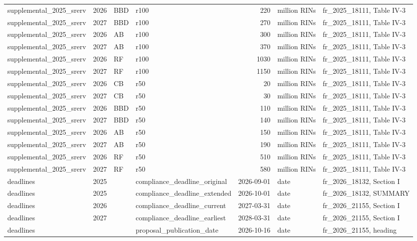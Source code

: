 \begin{longtable}{p{2.3cm}p{0.7cm}p{1.0cm}p{2.6cm}rp{1.7cm}p{4.6cm}}
supplemental\_2025\_srerv & 2026 & BBD & r100 & 220 & million RINs & fr\_2025\_18111, Table IV-3 \\
supplemental\_2025\_srerv & 2027 & BBD & r100 & 270 & million RINs & fr\_2025\_18111, Table IV-3 \\
supplemental\_2025\_srerv & 2026 & AB & r100 & 300 & million RINs & fr\_2025\_18111, Table IV-3 \\
supplemental\_2025\_srerv & 2027 & AB & r100 & 370 & million RINs & fr\_2025\_18111, Table IV-3 \\
supplemental\_2025\_srerv & 2026 & RF & r100 & 1030 & million RINs & fr\_2025\_18111, Table IV-3 \\
supplemental\_2025\_srerv & 2027 & RF & r100 & 1150 & million RINs & fr\_2025\_18111, Table IV-3 \\
supplemental\_2025\_srerv & 2026 & CB & r50 & 20 & million RINs & fr\_2025\_18111, Table IV-3 \\
supplemental\_2025\_srerv & 2027 & CB & r50 & 30 & million RINs & fr\_2025\_18111, Table IV-3 \\
supplemental\_2025\_srerv & 2026 & BBD & r50 & 110 & million RINs & fr\_2025\_18111, Table IV-3 \\
supplemental\_2025\_srerv & 2027 & BBD & r50 & 140 & million RINs & fr\_2025\_18111, Table IV-3 \\
supplemental\_2025\_srerv & 2026 & AB & r50 & 150 & million RINs & fr\_2025\_18111, Table IV-3 \\
supplemental\_2025\_srerv & 2027 & AB & r50 & 190 & million RINs & fr\_2025\_18111, Table IV-3 \\
supplemental\_2025\_srerv & 2026 & RF & r50 & 510 & million RINs & fr\_2025\_18111, Table IV-3 \\
supplemental\_2025\_srerv & 2027 & RF & r50 & 580 & million RINs & fr\_2025\_18111, Table IV-3 \\
deadlines & 2025 &  & compliance\_deadline\_original & 2026-09-01 & date & fr\_2026\_18132, Section I \\
deadlines & 2025 &  & compliance\_deadline\_extended & 2026-10-01 & date & fr\_2026\_18132, SUMMARY \\
deadlines & 2026 &  & compliance\_deadline\_current & 2027-03-31 & date & fr\_2026\_21155, Section I \\
deadlines & 2027 &  & compliance\_deadline\_earliest & 2028-03-31 & date & fr\_2026\_21155, Section I \\
deadlines &  &  & proposal\_publication\_date & 2026-10-16 & date & fr\_2026\_21155, heading \\

\end{longtable}
